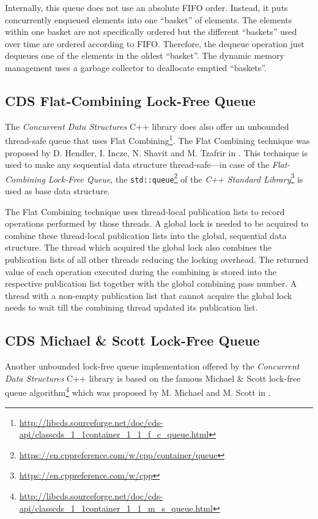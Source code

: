     Internally, this queue does not use an absolute FIFO order. Instead, it puts concurrently enqueued elements into one ``basket'' of elements. The elements within one basket are not specifically ordered but the different ``baskets'' used over time are ordered according to FIFO. Therefore, the dequeue operation just dequeues one of the elements in the oldest ``basket''. The dynamic memory management uses a garbage collector to deallocate emptied ``baskets''.

\subsection[CDS FCQueue]{CDS Flat-Combining Lock-Free Queue} \label{subsec:cds-fc}

    The \textit{Concurrent Data Structures} C++ library does also offer an unbounded thread-safe queue that uses Flat Combining\footnote{\url{http://libcds.sourceforge.net/doc/cds-api/classcds\_1\_1container\_1\_1\_f\_c\_queue.html}}. The Flat Combining technique was proposed by D. Hendler, I. Incze, N. Shavit and M. Tzafrir in \cite{Hendler:2010}.  This technique is used to make any sequential data structure thread-safe---in case of the \emph{Flat-Combining Lock-Free Queue}, the \lstinline{std::queue}\footnote{\url{https://en.cppreference.com/w/cpp/container/queue}} of the \textit{C++ Standard Library}\footnote{\url{https://en.cppreference.com/w/cpp}} is used as base data structure.

    The Flat Combining technique uses thread-local publication lists to record operations performed by those threads. A global lock is needed to be acquired to combine these thread-local publication lists into the global, sequential data structure. The thread which acquired the global lock also combines the publication lists of all other threads reducing the locking overhead. The returned value of each operation executed during the combining is stored into the respective publication list together with the global combining pass number. A thread with a non-empty publication list that cannot acquire the global lock needs to wait till the combining thread updated its publication list.

\subsection[CDS MSQueue]{CDS Michael \& Scott Lock-Free Queue} \label{subsec:cds-ms}

    Another unbounded lock-free queue implementation offered by the \textit{Concurrent Data Structures} C++ library is based on the famous Michael \& Scott lock-free queue algorithm\footnote{\url{http://libcds.sourceforge.net/doc/cds-api/classcds\_1\_1container\_1\_1\_m\_s\_queue.html}} which was proposed by M. Michael and M. Scott in \cite{Michael:1996}.

